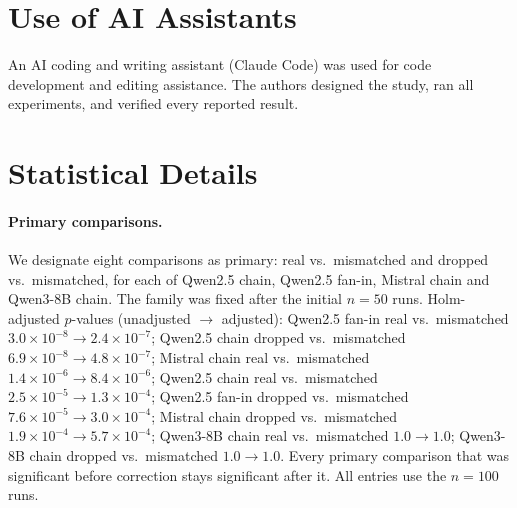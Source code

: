 \documentclass[11pt]{article}
\begin{document}
\section*{Use of AI Assistants}

An AI coding and writing assistant (Claude Code) was used for code
development and editing assistance. The authors designed the study, ran
all experiments, and verified every reported result.





\appendix

\section{Statistical Details}
\label{app:stats}

\paragraph{Primary comparisons.} We designate eight comparisons as primary:
real vs.\ mismatched and dropped vs.\ mismatched, for each of Qwen2.5 chain,
Qwen2.5 fan-in, Mistral chain and Qwen3-8B chain. The family was fixed after
the initial $n{=}50$ runs. Holm-adjusted $p$-values (unadjusted $\to$
adjusted): Qwen2.5 fan-in real vs.\ mismatched $3.0\times10^{-8}\to
2.4\times10^{-7}$; Qwen2.5 chain dropped vs.\ mismatched $6.9\times10^{-8}\to
4.8\times10^{-7}$; Mistral chain real vs.\ mismatched $1.4\times10^{-6}\to
8.4\times10^{-6}$; Qwen2.5 chain real vs.\ mismatched $2.5\times10^{-5}\to
1.3\times10^{-4}$; Qwen2.5 fan-in dropped vs.\ mismatched $7.6\times10^{-5}\to
3.0\times10^{-4}$; Mistral chain dropped vs.\ mismatched $1.9\times10^{-4}\to
5.7\times10^{-4}$; Qwen3-8B chain real vs.\ mismatched $1.0\to1.0$; Qwen3-8B
chain dropped vs.\ mismatched $1.0\to1.0$. Every primary comparison that was
significant before correction stays significant after it. All entries use the
$n{=}100$ runs.
\end{document}
